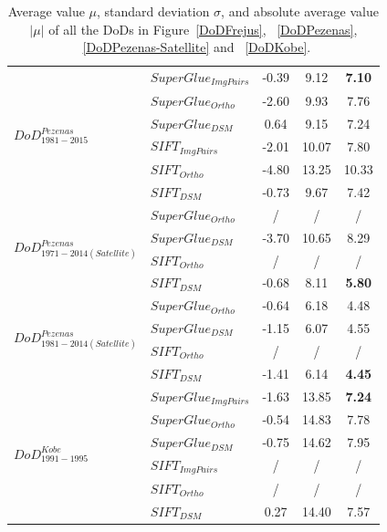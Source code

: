 \begin{table}
\begin{tabular}{||l|l|c|c|c||}
\multirow{6}{*}{$DoD^{Pezenas}_{1981-2015}$}
&${SuperGlue_{ImgPairs}}$ & -0.39 & 9.12 & \textbf{7.10}\\
&${SuperGlue_{Ortho}}$ & -2.60 & 9.93 & 7.76\\
&${SuperGlue_{DSM}}$ & 0.64 & 9.15 & 7.24\\
&${SIFT_{ImgPairs}}$ & -2.01 & 10.07 & 7.80\\
&${SIFT_{Ortho}}$ & -4.80 & 13.25 & 10.33\\
&${SIFT_{DSM}}$ & -0.73 & 9.67 & 7.42\\\hline

\multirow{4}{*}{$DoD^{Pezenas}_{1971-2014(Satellite)}$}
&${SuperGlue_{Ortho}}$ & / & / & /\\
&${SuperGlue_{DSM}}$ & -3.70 & 10.65 & 8.29\\
&${SIFT_{Ortho}}$ & / & / & /\\
&${SIFT_{DSM}}$ & -0.68 & 8.11 & \textbf{5.80} \\\hline

\multirow{4}{*}{$DoD^{Pezenas}_{1981-2014(Satellite)}$}
&${SuperGlue_{Ortho}}$ & -0.64 & 6.18 & 4.48\\
&${SuperGlue_{DSM}}$ & -1.15 & 6.07 & 4.55\\
&${SIFT_{Ortho}}$ & / & / & /\\
&${SIFT_{DSM}}$ & -1.41 & 6.14 & \textbf{4.45} \\\hline


\multirow{6}{*}{$DoD^{Kobe}_{1991-1995}$}
&${SuperGlue_{ImgPairs}}$ & -1.63 & 13.85 & \textbf{7.24}\\
&${SuperGlue_{Ortho}}$ & -0.54 & 14.83 & 7.78\\
&${SuperGlue_{DSM}}$ & -0.75 & 14.62 & 7.95\\
&${SIFT_{ImgPairs}}$ & / & / & / \\
&${SIFT_{Ortho}}$ & / & / & / \\
&${SIFT_{DSM}}$ & 0.27 & 14.40 & 7.57\\\hline
	
\end{tabular}
\caption{Average value $\mu$, standard deviation $\sigma$, and absolute average value $|\mu|$ of all the \ac{DoD}s in Figure~\ref{DoDFrejus}, ~\ref{DoDPezenas}, ~\ref{DoDPezenas-Satellite} and ~\ref{DoDKobe}.}
\label{DoDStatistic}
\end{table}


